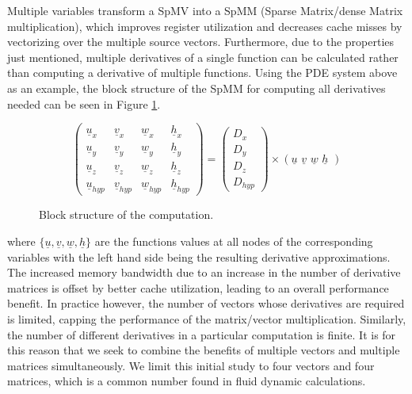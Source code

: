 Multiple variables transform a SpMV into a SpMM (Sparse Matrix/dense Matrix multiplication), which improves register utilization and decreases cache
misses by vectorizing over the multiple source vectors. Furthermore, due to the properties just mentioned, multiple derivatives of a single function can be calculated rather than computing a derivative of multiple functions. Using the PDE system above as an example, the block structure of the SpMM for computing all derivatives needed can be seen in Figure \ref{fig:struct_comp}.
\begin{figure}
  \centering
  \[ \left( \begin{array}{cccc}
    \underline{u}_x     & \underline{v}_x     & \underline{w}_x     & \underline{h}_x \\
    \underline{u}_y     & \underline{v}_y     & \underline{w}_y     & \underline{h}_y \\
    \underline{u}_z     & \underline{v}_z     & \underline{w}_z     & \underline{h}_z \\
    \underline{u}_{hyp} & \underline{v}_{hyp} & \underline{w}_{hyp} & \underline{h}_{hyp}
  \end{array} \right)
  = \left(
  \begin{array}{c}
    D_{x}\\
    D_{y}\\
    D_{z}\\
    D_{hyp}
  \end{array}\right)
  \times \left(\underline{u} \,\, \underline{v} \,\, \underline{w} \,\, \underline{h} \,\,\right) \]
  \caption{Block structure of the computation.}
  \label{fig:struct_comp}
\end{figure}
where $\{\underline{u},\underline{v}, \underline{w}, \underline{h}\}$ are the functions values at all nodes of the corresponding variables with the left hand side being the resulting derivative approximations. The increased memory bandwidth due to an increase in the number of derivative matrices is offset by better cache utilization, leading to an overall performance benefit. In practice however, the number of vectors whose derivatives are required is limited, capping the performance of the matrix/vector multiplication. Similarly, the number of different derivatives in a particular computation is finite. It is for this reason that we seek to combine the benefits of multiple vectors and multiple matrices simultaneously. We limit this initial study to four vectors and four matrices, which is a common number found in fluid dynamic calculations.

%
